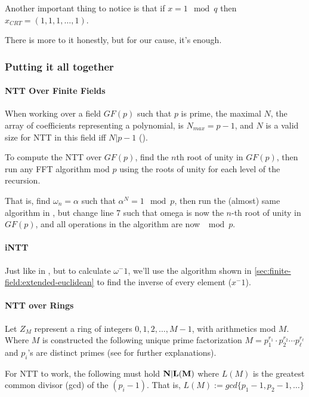 Another important thing to notice is that if  $x=1 \mod q$
 then $x_{CRT}= (1,1,1,\dots,1)$.


There is more to it honestly, but for our cause, it's enough.

\subsubsection{Putting it all together}

\paragraph[NTT Over Finite Fields]{\bf NTT Over Finite Fields} \label{ntt-field}
When working over a field $GF(p)$ such that $p$ is prime,
the maximal $N$, the array of coefficients representing a
polynomial, is $N_{max}=p-1$, and $N$ is a valid size for NTT
 in this field iff $N|p-1$ (\cite[III. number theoretic transforms]{ntt}). 


To compute the NTT over $GF(p)$, find the $n$th root of unity in $GF(p)$,
 then run any FFT algorithm mod $p$ using the roots
of unity for each level of the recursion.

That is, find $\omega_n=\alpha$ such that $\alpha^N=1 \mod p$, 
then run the (almost) same algorithm in , 
but change line 7 such that omega is now the $n$-th root of unity in $GF(p)$, and
all operations in the algorithm are now $\mod p$.

\paragraph{\bf iNTT}
Just like in , but to calculate $\omega^-1$, we'll
use the algorithm shown in \autoref{sec:finite-field:extended-euclidean} 
to find the inverse of every element ($x^-1$).



\paragraph[short]{\bf NTT over Rings}
Let $Z_M$ represent a ring of integers ${0,1,2,\dots , M-1}$,
with arithmetics mod $M$.
Where $M$ is constructed the following unique prime factorization
$M=p_{1}^{r_1}\cdot  p_{2}^{r_2} \cdots p_{\ell}^{r_\ell}$
and $p_i$'s are distinct primes (see \cite[NTT sec. III][]{ntt}
 for further explanations).

For NTT to work, the following must hold $\bf N|L(M)$
where $L(M)$ is the greatest common
divisor (gcd) of the $(p_{i}-1)$. That is, 
$L(M):= gcd\{p_1-1,p_2-1,\dots\}$


